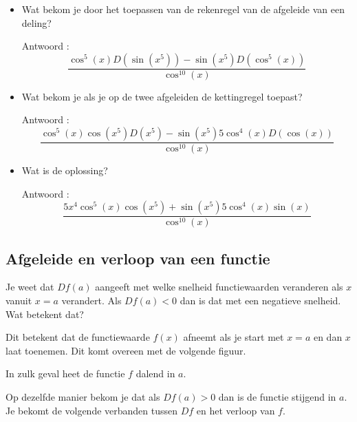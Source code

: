 \begin{enumerate}
\begin{itemize}
		\item Wat bekom je door het toepassen van de rekenregel van de afgeleide van een deling?
		
		Antwoord : \[\frac {\cos ^5(x)D\left( \sin \left(  x^5  \right)  \right)-\sin \left(  x^5 \right)D\left( \cos^5(x)  \right)}{\cos ^{10}(x)}\]
		
		\item Wat bekom je als je op de twee afgeleiden de kettingregel toepast?
		
		Antwoord : \[\frac {\cos ^5(x) \cos \left(  x^5  \right) D\left( x^5 \right)-\sin \left(  x^5 \right)5 \cos^4(x) D(\cos (x))}{\cos ^{10}(x)}\]
		
		\item Wat is de oplossing?
		
		Antwoord : \[\frac {5x^4\cos ^5(x) \cos \left(  x^5  \right)+\sin \left(  x^5 \right)5 \cos^4(x) \sin (x)}{\cos ^{10}(x)}\]
		
	\end{itemize}
	
	
\end{enumerate}


\subsection{Afgeleide en verloop van een functie}

Je weet dat $Df(a)$ aangeeft met welke snelheid functiewaarden veranderen als $x$ vanuit $x=a$ verandert.
Als $Df(a)<0$ dan is dat met een negatieve snelheid. Wat betekent dat?\vspace{5mm}

Dit betekent dat de functiewaarde $f(x)$ afneemt als je start met $x=a$ en dan $x$ laat toenemen.
Dit komt overeen met de volgende figuur.



In zulk geval heet de functie $f$ dalend in $a$.\vspace{5mm}

Op dezelfde manier bekom je dat als $Df(a)>0$ dan is de functie stijgend in $a$.
Je bekomt de volgende verbanden tussen $Df$ en het verloop van $f$.

